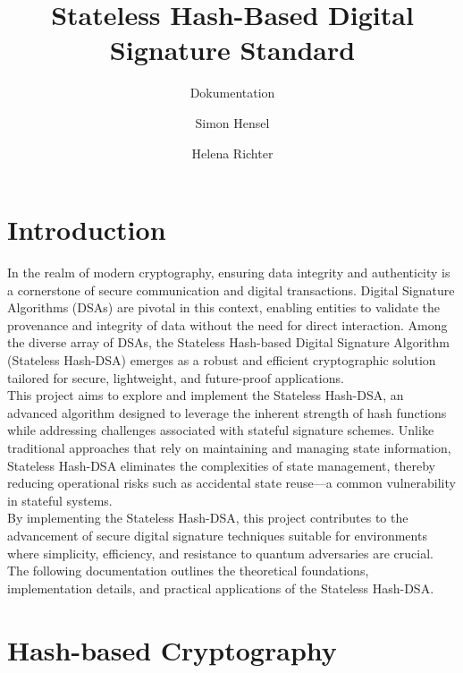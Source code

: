 \documentclass[journal=tosc,notanonymous]{iacrtrans}
\author{Simon Hensel\inst{1} \and Helena Richter\inst{2}}
\institute{Albstadt-Sigmaringen University, Albstadt, Germany, \email{hensels1@hs-albsig.de} \and
	Albstadt-Sigmaringen University, Albstadt, Germany, \email{richtehe@hs-albsig.de}}
\title{Stateless Hash-Based Digital Signature Standard}
\subtitle{Dokumentation}
\begin{document}
\maketitle




\begin{abstract}
  \lipsum[1]
\end{abstract}


\section{Introduction}

In the realm of modern cryptography, ensuring data integrity and authenticity is a cornerstone of secure communication and digital transactions. Digital Signature Algorithms (DSAs) are pivotal in this context, enabling entities to validate the provenance and integrity of data without the need for direct interaction. Among the diverse array of DSAs, the Stateless Hash-based Digital Signature Algorithm (Stateless Hash-DSA) emerges as a robust and efficient cryptographic solution tailored for secure, lightweight, and future-proof applications.
\\
This project aims to explore and implement the Stateless Hash-DSA, an advanced algorithm designed to leverage the inherent strength of hash functions while addressing challenges associated with stateful signature schemes. Unlike traditional approaches that rely on maintaining and managing state information, Stateless Hash-DSA eliminates the complexities of state management, thereby reducing operational risks such as accidental state reuse—a common vulnerability in stateful systems.
\\
By implementing the Stateless Hash-DSA, this project contributes to the advancement of secure digital signature techniques suitable for environments where simplicity, efficiency, and resistance to quantum adversaries are crucial. The following documentation outlines the theoretical foundations, implementation details, and practical applications of the Stateless Hash-DSA.

\section{Hash-based Cryptography}
\end{document}
